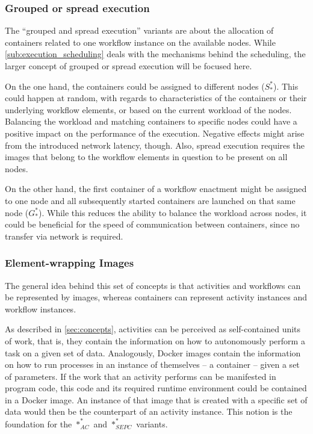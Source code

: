   \subsubsection{Grouped or spread execution} %
  \label{ssub:grouped_or_spread_execution}
    The ``grouped and spread execution'' variants are about the allocation of containers related to one workflow instance on the available nodes. While \ref{sub:execution_scheduling} deals with the mechanisms behind the scheduling, the larger concept of grouped or spread execution will be focused here.

    On the one hand, the containers could be assigned to different nodes ($S_*^*$). This could happen at random, with regards to characteristics of the containers or their underlying workflow elements, or based on the current workload of the nodes. Balancing the workload and matching containers to specific nodes could have a positive impact on the performance of the execution. Negative effects might arise from the introduced network latency, though. Also, spread execution requires the images that belong to the workflow elements in question to be present on all nodes.

    On the other hand, the first container of a workflow enactment might be assigned to one node and all subsequently started containers are launched on that same node ($G_*^*$). While this reduces the ability to balance the workload across nodes, it could be beneficial for the speed of communication between containers, since no transfer via network is required.

  \subsubsection{Element-wrapping Images} %
  \label{ssub:element_wrapping_containers}
    The general idea behind this set of concepts is that activities and workflows can be represented by images, whereas containers can represent activity instances and workflow instances.

    As described in \ref{sec:concepts}, activities can be perceived as self-contained units of work, that is, they contain the information on how to autonomously perform a task on a given set of data.
    Analogously, Docker images contain the information on how to run processes in an instance of themselves -- a container -- given a set of parameters. If the work that an activity performs can be manifested in  program code, this code and its required runtime environment could be contained in a Docker image. An instance of that image that is created with a specific set of data would then be the counterpart of an activity instance. This notion is the foundation for the $*_{AC}^{*}$ and $*_{SEPC}^{*}$ variants.

